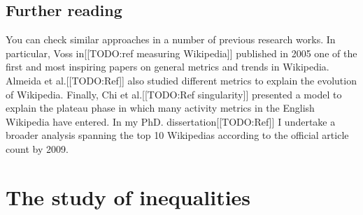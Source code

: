 
\section{Further reading}
\label{subsec:overall-further-reading}
You can check similar approaches in a number of previous research works. In
particular, Voss in[[TODO:ref measuring Wikipedia]] published in 2005 one of the
first and most inspiring papers on general metrics and trends in Wikipedia.
Almeida et al.[[TODO:Ref]] also studied different metrics to explain the evolution
of Wikipedia. Finally, Chi et al.[[TODO:Ref singularity]] presented a model to
explain the plateau phase in which many activity metrics in the English Wikipedia
have entered. In my PhD. dissertation[[TODO:Ref]] I undertake a broader analysis
spanning the top 10 Wikipedias according to the official article count by 2009.

% 
% 
% 
% 
% 

\chapter{The study of inequalities}

